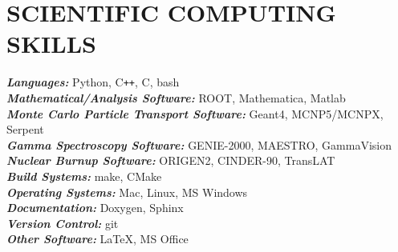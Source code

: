 \section{\small{SCIENTIFIC COMPUTING \\ SKILLS}}

{\sl\bf Languages:} \hfill Python, C\verb!++!, C, bash\\
{\sl\bf Mathematical/Analysis Software:} \hfill ROOT, Mathematica, Matlab\\ %
{\sl\bf Monte Carlo Particle Transport Software:} \hfill Geant4, MCNP5/MCNPX, Serpent\\
{\sl\bf Gamma Spectroscopy Software:} \hfill GENIE-2000, MAESTRO, GammaVision\\
{\sl\bf Nuclear Burnup Software:} \hfill ORIGEN2, CINDER-90, TransLAT\\
{\sl\bf Build Systems:} \hfill make, CMake\\
{\sl\bf Operating Systems:} \hfill Mac, Linux, MS Windows\\
{\sl\bf Documentation:} \hfill Doxygen, Sphinx\\
{\sl\bf Version Control:} \hfill git\\
{\sl\bf Other Software:} \hfill \LaTeX, MS Office